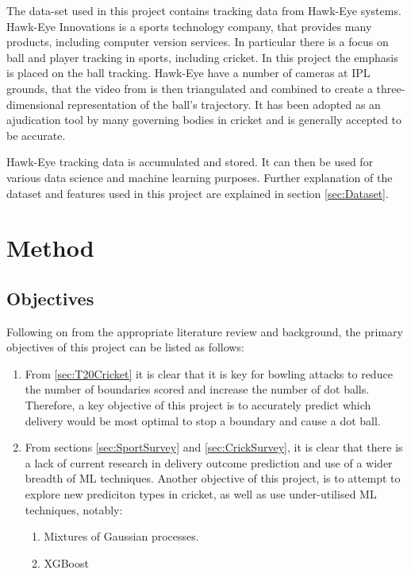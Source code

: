 \documentclass[12pt,a4paper]{report}
\theoremstyle{definition}
\begin{document}
The data-set used in this project contains tracking data from Hawk-Eye systems.
Hawk-Eye Innovations is a sports technology company, that provides many products, including computer version services.
In particular there is a focus on ball and player tracking in sports, including cricket.
In this project the emphasis is placed on the ball tracking.
Hawk-Eye have a number of cameras at IPL grounds, that the video from is then triangulated and combined to create a three-dimensional representation of the ball's trajectory.
It has been adopted as an ajudication tool by many governing bodies in cricket and is generally accepted to be accurate.

Hawk-Eye tracking data is accumulated and stored. 
It can then be used for various data science and machine learning purposes.
Further explanation of the dataset and features used in this project are explained in section \ref{sec:Dataset}.

\chapter{Method} \label{chap:Method}

\section{Objectives}

Following on from the appropriate literature review and background, the primary objectives of this project can be listed as follows:

\begin{enumerate}
  \item From \ref{sec:T20Cricket} it is clear that it is key for bowling attacks to reduce the number of boundaries scored and increase the number of dot balls.
Therefore, a key objective of this project is to accurately predict which delivery would be most optimal to stop a boundary and cause a dot ball.
  \item From sections \ref{sec:SportSurvey} and \ref{sec:CrickSurvey}, it is clear that there is a lack of current research in delivery outcome prediction and use of a wider breadth of ML techniques. 
Another objective of this project, is to attempt to explore new prediciton types in cricket, as well as use under-utilised  ML techniques, notably:
  \begin{enumerate}
	\item Mixtures of Gaussian processes.
	\item XGBoost
  \end{enumerate}
\end{enumerate}
\end{document}
